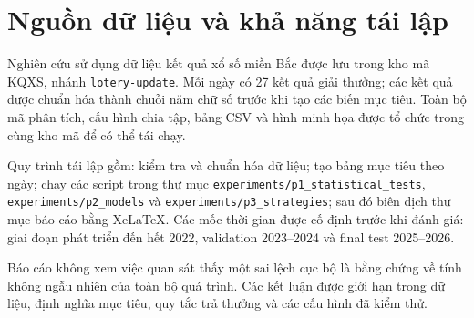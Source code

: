 \chapter*{Nguồn dữ liệu và khả năng tái lập}

Nghiên cứu sử dụng dữ liệu kết quả xổ số miền Bắc được lưu trong kho mã KQXS, nhánh \texttt{lotery-update}. Mỗi ngày có 27 kết quả giải thưởng; các kết quả được chuẩn hóa thành chuỗi năm chữ số trước khi tạo các biến mục tiêu. Toàn bộ mã phân tích, cấu hình chia tập, bảng CSV và hình minh họa được tổ chức trong cùng kho mã để có thể tái chạy.

Quy trình tái lập gồm: kiểm tra và chuẩn hóa dữ liệu; tạo bảng mục tiêu theo ngày; chạy các script trong thư mục \texttt{experiments/p1\_statistical\_tests}, \texttt{experiments/p2\_models} và \texttt{experiments/p3\_strategies}; sau đó biên dịch thư mục báo cáo bằng XeLaTeX. Các mốc thời gian được cố định trước khi đánh giá: giai đoạn phát triển đến hết 2022, validation 2023--2024 và final test 2025--2026.

Báo cáo không xem việc quan sát thấy một sai lệch cục bộ là bằng chứng về tính không ngẫu nhiên của toàn bộ quá trình. Các kết luận được giới hạn trong dữ liệu, định nghĩa mục tiêu, quy tắc trả thưởng và các cấu hình đã kiểm thử.
